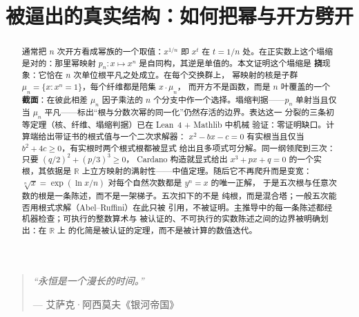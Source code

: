 \documentclass[submission,noinfoline]{jsfds}
\begin{document}
\begin{frontmatter}

\title{被逼出的真实结构：如何把幂与开方劈开}

\begin{aug}
\end{aug}

\begin{abstract}
通常把 $n$ 次开方看成幂族的一个取值：$x^{1/n}$ 即 $x^t$ 在
$t=1/n$ 处。在正实数上这个塌缩是对的：那里幂映射
$p_n\colon x\mapsto x^n$ 是自同构，其逆是单值的。本文证明这个塌缩是
\textbf{挠}现象：它恰在 $n$ 次单位根平凡之处成立。在每个交换群上，
幂映射的核是子群 $\mu_n=\{x:x^n=1\}$，每个纤维都是陪集 $x\cdot\mu_n$，
而开方不是函数，而是 $n$ 叶覆盖的一个\textbf{截面}：在彼此相差
$\mu_n$ 因子乘法的 $n$ 个分支中作一个选择。塌缩判据——$p_n$ 单射当且仅当
$\mu_n$ 平凡——标出``根与分数次幂的同一化''仍然存活的边界。表达这一
分裂的三条初等定理（核、纤维、塌缩判据）已在 Lean~4 + Mathlib 中机械
验证：零证明缺口。计算端给出带证书的根式值与一个二次求解器：
$x^2-bx-c=0$ 有实根当且仅当 $b^2+4c\ge0$，有实根时两个根式根都被显式
给出且多项式可分解。同一纲领爬到三次：只要 $(q/2)^2+(p/3)^3\ge0$，
Cardano 构造就显式给出 $x^3+px+q=0$ 的一个实根，其依据是 $\mathbb R$
上立方映射的满射性——中值定理。随后它不再爬升而是变宽：
$\sqrt[n]{x}=\exp(\ln x/n)$ 对每个自然次数都是 $y^n=x$ 的唯一正解，
于是五次根与任意次数的根是一条陈述，而不是一架梯子。五次扣下的不是
纯根，而是混合塔；一般五次能否用根式求解（Abel--Ruffini）在此只被
引用，不被证明。主推导中的每一条陈述都经机器检查；可执行的整数算术与
被认证的、不可执行的实数陈述之间的边界被明确划出：在 $\mathbb R$ 上
的化简是被认证的定理，而不是被计算的数值迭代。
\end{abstract}

\begin{keywords}
\end{keywords}

\begin{AMSclass}
\end{AMSclass}
\end{frontmatter}

\begin{quote}
  \itshape ``永恒是一个漫长的时间。''
  \par\vspace{2pt}
  \begin{flushright}
    \small --- 艾萨克·阿西莫夫《银河帝国》
  \end{flushright}
\end{quote}
\vspace{0.8em}
\end{document}
